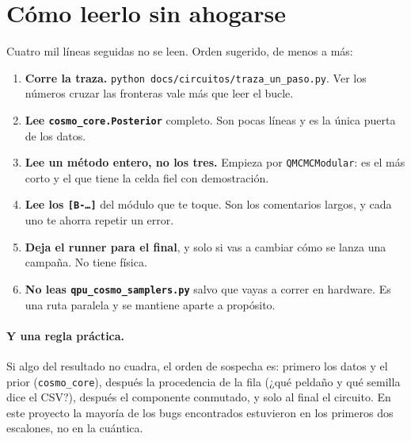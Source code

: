 \documentclass[11pt,a4paper]{article}
\newcommand{\M}[1]{\texttt{#1}}
\begin{document}
\section{Cómo leerlo sin ahogarse}

Cuatro mil líneas seguidas no se leen. Orden sugerido, de menos a más:

\begin{enumerate}[leftmargin=1.8em]
  \item \textbf{Corre la traza.}
    \M{python docs/circuitos/traza\_un\_paso.py}. Ver los números cruzar
    las fronteras vale más que leer el bucle.
  \item \textbf{Lee \M{cosmo\_core.Posterior}} completo. Son pocas líneas
    y es la única puerta de los datos.
  \item \textbf{Lee un método entero, no los tres.} Empieza por
    \M{QMCMCModular}: es el más corto y el que tiene la celda fiel con
    demostración.
  \item \textbf{Lee los \M{[B-\ldots]}} del módulo que te toque. Son los
    comentarios largos, y cada uno te ahorra repetir un error.
  \item \textbf{Deja el runner para el final}, y solo si vas a cambiar
    cómo se lanza una campaña. No tiene física.
  \item \textbf{No leas \M{qpu\_cosmo\_samplers.py}} salvo que vayas a
    correr en hardware. Es una ruta paralela y se mantiene aparte a
    propósito.
\end{enumerate}

\paragraph{Y una regla práctica.} Si algo del resultado no cuadra, el orden
de sospecha es: primero los datos y el prior (\M{cosmo\_core}), después la
procedencia de la fila (¿qué peldaño y qué semilla dice el CSV?), después
el componente conmutado, y solo al final el circuito. En este proyecto la
mayoría de los bugs encontrados estuvieron en los primeros dos escalones,
no en la cuántica.
\end{document}
